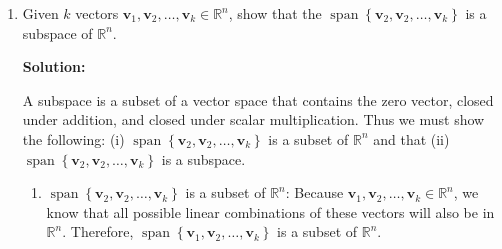 \begin{enumerate}[label=(\alph*)]
	\item Given $k$ vectors $\mathbf{v}_1, \mathbf{v}_2, \ldots,
		      \mathbf{v}_{k} \in \mathbb{R}^n$, show that the
	      $\operatorname{span}\left\{\mathbf{v}_{2},
		      \mathbf{v}_{2}, \ldots, \mathbf{v}_{k}\right\}$ is a
	      subspace of $\mathbb{R}^n$.

	      \par \textbf{Solution:}
	      \par A subspace is a subset of a vector space that contains the zero
	      vector, closed under addition, and closed under scalar multiplication.
	      Thus we must show the following: (i) $\operatorname{span}\left\{\mathbf{v}_{2},
		      \mathbf{v}_{2}, \ldots, \mathbf{v}_{k}\right\}$ is a subset of
	      $\mathbb{R}^n$ and that (ii) $\operatorname{span}\left\{\mathbf{v}_{2},
		      \mathbf{v}_{2}, \ldots, \mathbf{v}_{k}\right\}$ is a subspace.

	      \begin{enumerate}[label=\roman*.]
		      \item $\operatorname{span}\left\{\mathbf{v}_{2},
			            \mathbf{v}_{2}, \ldots, \mathbf{v}_{k}\right\}$ is a subset of
		            $\mathbb{R}^n$: Because $\mathbf{v}_1, \mathbf{v}_2, \ldots,
			            \mathbf{v}_{k} \in \mathbb{R}^n$, we know that all possible linear
		            combinations of these vectors will also be in $\mathbb{R}^n$.
		            Therefore, $\operatorname{span}\left\{\mathbf{v}_{1},
			            \mathbf{v}_{2}, \ldots, \mathbf{v}_{k}\right\}$ is a subset of
		            $\mathbb{R}^n$.


\end{enumerate}
\end{enumerate}
